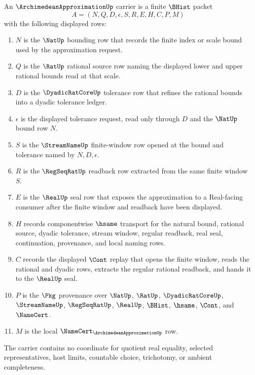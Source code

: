 \begin{definition}
\label{def:archimedean-approximation-carrier}
An $\ArchimedeanApproximationUp$ carrier is a finite $\BHist$ packet
$$
A=(N,Q,D,\epsilon,S,R,E,H,C,P,M)
$$
with the following displayed rows:
\begin{enumerate}
\item $N$ is the $\NatUp$ bounding row that records the finite index or scale bound used by the approximation request.
\item $Q$ is the $\RatUp$ rational source row naming the displayed lower and upper rational bounds read at that scale.
\item $D$ is the $\DyadicRatCoreUp$ tolerance row that refines the rational bounds into a dyadic tolerance ledger.
\item $\epsilon$ is the displayed tolerance request, read only through $D$ and the $\NatUp$ bound row $N$.
\item $S$ is the $\StreamNameUp$ finite-window row opened at the bound and tolerance named by $N,D,\epsilon$.
\item $R$ is the $\RegSeqRatUp$ readback row extracted from the same finite window $S$.
\item $E$ is the $\RealUp$ seal row that exposes the approximation to a Real-facing consumer after the finite window and readback have been displayed.
\item $H$ records componentwise $\hsame$ transport for the natural bound, rational source, dyadic tolerance, stream window, regular readback, real seal, continuation, provenance, and local naming rows.
\item $C$ records the displayed $\Cont$ replay that opens the finite window, reads the rational and dyadic rows, extracts the regular rational readback, and hands it to the $\RealUp$ seal.
\item $P$ is the $\Pkg$ provenance over $\NatUp$, $\RatUp$, $\DyadicRatCoreUp$, $\StreamNameUp$, $\RegSeqRatUp$, $\RealUp$, $\BHist$, $\hsame$, $\Cont$, and $\NameCert$.
\item $M$ is the local $\NameCert_{\ArchimedeanApproximationUp}$ row.
\end{enumerate}
The carrier contains no coordinate for quotient real equality, selected representatives, host limits, countable choice, trichotomy, or ambient completeness.
\end{definition}

